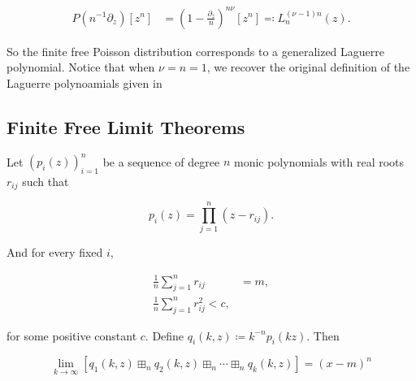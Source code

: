 \begin{align*}
    P(n^{-1}\partial_z)[z^n] &= \left( 1 - \frac{\partial_z}{n} \right)^{n\nu}[z^n] \eqcolon L_n^{(\nu-1)n}(z).
\end{align*}

So the finite free Poisson distribution corresponds to a generalized Laguerre polynomial. Notice that when $\nu=n=1$, we recover the original definition of the Laguerre polynoamials given in 

\subsection{Finite Free Limit Theorems}

\begin{theorem}
    Let $(p_i(z))_{i=1}^n$ be a sequence of degree $n$ monic polynomials with real roots $r_{ij}$ such that

    \begin{equation*}
        p_i(z) = \prod_{j=1}^n (z - r_{ij}).
    \end{equation*}

    And for every fixed $i$,

    \begin{align*}
        \frac1n\sum_{j=1}^n r_{ij} &= m,\\
        \frac1n\sum_{j=1}^n r_{ij}^2 < c,
    \end{align*}

    \noindent for some positive constant $c$. Define $q_i(k,z) \coloneqq k^{-n}p_i(kz)$. Then

    \begin{equation*}
        \lim_{k\to \infty} [ q_1(k,z) \boxplus_n q_2(k,z) \boxplus_n \cdots \boxplus_n q_k(k,z) ] = (x-m)^n
    \end{equation*}
\end{theorem}

